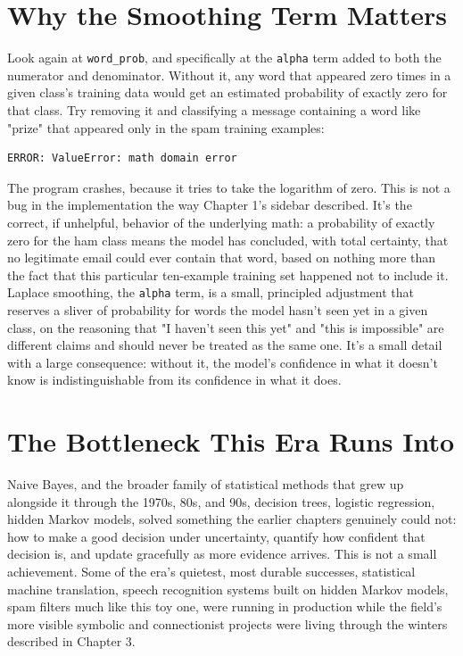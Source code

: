 \section*{Why the Smoothing Term Matters}

Look again at \texttt{word\_prob}, and specifically at the \texttt{alpha} term added to both the numerator and denominator. Without it, any word that appeared zero times in a given class's training data would get an estimated probability of exactly zero for that class. Try removing it and classifying a message containing a word like "prize" that appeared only in the spam training examples:

\begin{Verbatim}[fontsize=\small, frame=single, xleftmargin=1em, xrightmargin=1em]
ERROR: ValueError: math domain error
\end{Verbatim}

The program crashes, because it tries to take the logarithm of zero. This is not a bug in the implementation the way Chapter 1's sidebar described. It's the correct, if unhelpful, behavior of the underlying math: a probability of exactly zero for the ham class means the model has concluded, with total certainty, that no legitimate email could ever contain that word, based on nothing more than the fact that this particular ten-example training set happened not to include it. Laplace smoothing, the \texttt{alpha} term, is a small, principled adjustment that reserves a sliver of probability for words the model hasn't seen yet in a given class, on the reasoning that "I haven't seen this yet" and "this is impossible" are different claims and should never be treated as the same one. It's a small detail with a large consequence: without it, the model's confidence in what it doesn't know is indistinguishable from its confidence in what it does.

\section*{The Bottleneck This Era Runs Into}

Naive Bayes, and the broader family of statistical methods that grew up alongside it through the 1970s, 80s, and 90s, decision trees, logistic regression, hidden Markov models, solved something the earlier chapters genuinely could not: how to make a good decision under uncertainty, quantify how confident that decision is, and update gracefully as more evidence arrives. This is not a small achievement. Some of the era's quietest, most durable successes, statistical machine translation, speech recognition systems built on hidden Markov models, spam filters much like this toy one, were running in production while the field's more visible symbolic and connectionist projects were living through the winters described in Chapter 3.

